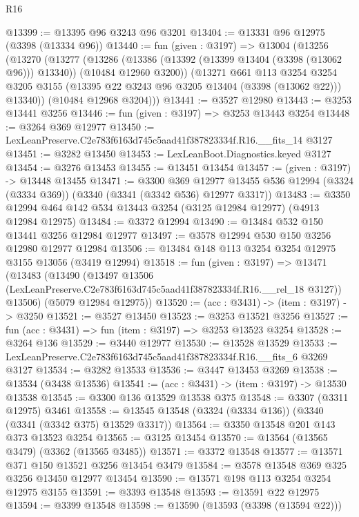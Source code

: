 \begin{lexlean}{R16}
\begin{coremodule}
@13399 := @13395 @96 @3243 @96 @3201
@13404 := @13331 @96 @12975 (@3398 (@13334 @96))
@13440 := fun (given : @3197) =>
  @13004
    (@13256
      (@13270
        (@13277
          (@13286
            (@13386 (@13392 (@13399 @13404 (@3398 (@13062 @96))) @13340))
            (@10484 @12960 @3200))
          (@13271
            @661
            @113
            @3254
            @3254
            @3205
            @3155
            (@13395 @22 @3243 @96 @3205 @13404 (@3398 (@13062 @22)))
            @13340))
        (@10484 @12968 @3204)))
@13441 := @3527 @12980
@13443 := @3253 @13441 @3256
@13446 := fun (given : @3197) => @3253 @13443 @3254
@13448 := @3264 @369 @12977
@13450 := LexLeanPreserve.C2e783f6163d745c5aad41f387823334f.R16.__fits_14 @3127
@13451 := @3282 @13450
@13453 := LexLeanBoot.Diagnostics.keyed @3127
@13454 := @3276 @13453
@13455 := @13451 @13454
@13457 := (given : @3197) -> @13448 @13455
@13471 := @3300
    @369
    @12977
    @13455
    @536
    @12994
    (@3324 (@3334 @369))
    (@3340 (@3341 (@3342 @536) @12977 @3317))
@13483 := @3350 @12994 @464 @142 @534 @13443 @3254 (@3125 @12984 @12977) (@4913 @12984 @12975)
@13484 := @3372 @12994
@13490 := @13484 @532 @150 @13441 @3256 @12984 @12977
@13497 := @3578 @12994 @530 @150 @3256 @12980 @12977 @12984
@13506 := @13484 @148 @113 @3254 @3254 @12975 @3155 @13056 (@3419 @12994)
@13518 := fun (given : @3197) =>
  @13471
    (@13483
      (@13490
        (@13497 @13506 (LexLeanPreserve.C2e783f6163d745c5aad41f387823334f.R16.__rel_18 @3127))
        @13506)
      (@5079 @12984 @12975))
@13520 := (acc : @3431) -> (item : @3197) -> @3250
@13521 := @3527 @13450
@13523 := @3253 @13521 @3256
@13527 := fun (acc : @3431) => fun (item : @3197) => @3253 @13523 @3254
@13528 := @3264 @136
@13529 := @3440 @12977
@13530 := @13528 @13529
@13533 := LexLeanPreserve.C2e783f6163d745c5aad41f387823334f.R16.__fits_6 @3269 @3127
@13534 := @3282 @13533
@13536 := @3447 @13453 @3269
@13538 := @13534 (@3438 @13536)
@13541 := (acc : @3431) -> (item : @3197) -> @13530 @13538
@13545 := @3300 @136 @13529 @13538 @375
@13548 := @3307 (@3311 @12975) @3461
@13558 := @13545 @13548 (@3324 (@3334 @136)) (@3340 (@3341 (@3342 @375) @13529 @3317))
@13564 := @3350 @13548 @201 @143 @373 @13523 @3254
@13565 := @3125 @13454
@13570 := @13564 (@13565 @3479) (@3362 (@13565 @3485))
@13571 := @3372 @13548
@13577 := @13571 @371 @150 @13521 @3256 @13454 @3479
@13584 := @3578 @13548 @369 @325 @3256 @13450 @12977 @13454
@13590 := @13571 @198 @113 @3254 @3254 @12975 @3155
@13591 := @3393 @13548
@13593 := @13591 @22 @12975
@13594 := @3399 @13548
@13598 := @13590 (@13593 (@3398 (@13594 @22)))

\end{coremodule}
\end{lexlean}
